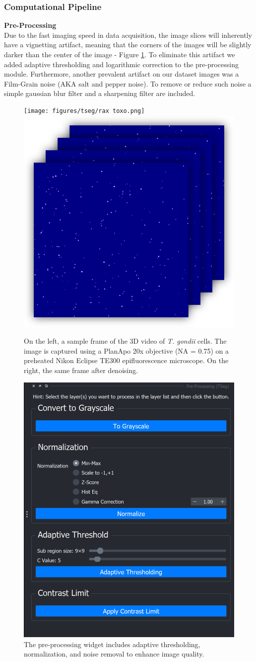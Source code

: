 \documentclass[./dissertation.tex]{subfiles}
\begin{document}
\subsubsection{Computational Pipeline}
\textbf{Pre-Processing} \\
Due to the fast imaging speed in data acquisition, the image slices will inherently have a vignetting artifact, meaning that the corners of the images will be slightly darker than the center of the image - Figure \ref{fig:raw_toxo}. To eliminate this artifact we added adaptive thresholding and logarithmic correction to the pre-processing module. Furthermore, another prevalent artifact on our dataset images was a Film-Grain noise (AKA salt and pepper noise). To remove or reduce such noise a simple gaussian blur filter and a sharpening filter are included.

\begin{figure}[h]
    \centering\texttt{[image: figures/tseg/rax toxo.png]}
    \centering\includegraphics[width=.3\textwidth]{figures/tseg/denoised.png}
    \caption{On the left, a sample frame of the 3D video of \textit{\textit{T. gondii}} cells. The image is captured using a PlanApo 20x objective (NA = 0.75) on a preheated Nikon Eclipse TE300 epifluorescence microscope. On the right, the same frame after denoising.}
    \label{fig:raw_toxo}
\end{figure}


\begin{figure}[h]
    \centering\includegraphics[width=.3\textwidth]{figures/tseg/pre widget.png}
    \caption{The pre-processing widget includes adaptive thresholding, normalization, and noise removal to enhance image quality.}
    \label{fig:preprocessing_widget}
\end{figure}
\end{document}
